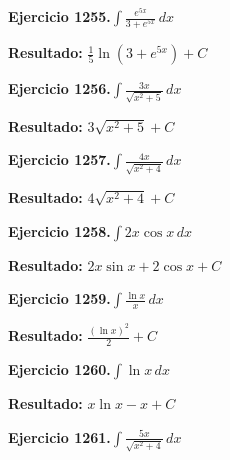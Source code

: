 \documentclass[10pt,a4paper]{article}
\begin{document}
\newpage
\begin{ejbox}
\textbf{Ejercicio 1255.}\quad $\int \frac{e^{5x}}{3+e^{5x}}\,dx$
\end{ejbox}

\begin{solbox}
\textbf{Resultado:} \(\displaystyle \frac{1}{5}\ln(3+e^{5x}) + C\)
\end{solbox}

\begin{ejbox}
\textbf{Ejercicio 1256.}\quad $\int \frac{3x}{\sqrt{x^2+5}}\,dx$
\end{ejbox}

\begin{solbox}
\textbf{Resultado:} \(\displaystyle 3\sqrt{x^2+5} + C\)
\end{solbox}

\begin{ejbox}
\textbf{Ejercicio 1257.}\quad $\int \frac{4x}{\sqrt{x^2+4}}\,dx$
\end{ejbox}

\begin{solbox}
\textbf{Resultado:} \(\displaystyle 4\sqrt{x^2+4} + C\)
\end{solbox}

\newpage
\begin{ejbox}
\textbf{Ejercicio 1258.}\quad $\int 2x \cos x\,dx$
\end{ejbox}

\begin{solbox}
\textbf{Resultado:} \(\displaystyle 2x\sin x + 2\cos x + C\)
\end{solbox}

\begin{ejbox}
\textbf{Ejercicio 1259.}\quad $\int \frac{\ln x}{x}\,dx$
\end{ejbox}

\begin{solbox}
\textbf{Resultado:} \(\displaystyle \frac{(\ln x)^2}{2} + C\)
\end{solbox}

\begin{ejbox}
\textbf{Ejercicio 1260.}\quad $\int \ln x\,dx$
\end{ejbox}

\begin{solbox}
\textbf{Resultado:} \(\displaystyle x\ln x - x + C\)
\end{solbox}

\newpage
\begin{ejbox}
\textbf{Ejercicio 1261.}\quad $\int \frac{5x}{\sqrt{x^2+4}}\,dx$
\end{ejbox}
\end{document}

